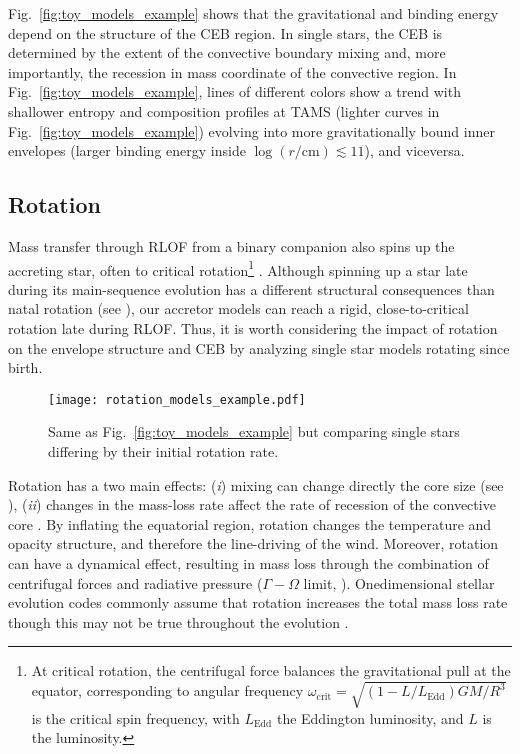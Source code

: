 \documentclass[twocolumn,twocolappendix,trackchanges]{aastex63}
\DeclareRobustCommand{\Figref}[1]{Fig.~\ref{#1}}
\begin{document}
\Figref{fig:toy_models_example} shows that the gravitational and
binding energy depend on the structure of the CEB region. In single
stars, the CEB is determined by the extent of the convective boundary
mixing and, more importantly, the recession in mass coordinate of the
convective region. In \Figref{fig:toy_models_example}, lines of
different colors show a trend with shallower entropy and composition
profiles at TAMS (lighter curves in \Figref{fig:toy_models_example})
evolving into more gravitationally bound inner envelopes (larger
binding energy inside $\log(r/\mathrm{cm})\lesssim 11$), and viceversa.

\subsection{Rotation}
\label{sec:rot_examples}

Mass transfer through RLOF from a binary companion also spins up the
accreting star, often to critical rotation\footnote{At critical
  rotation, the centrifugal force
  balances the gravitational pull at the equator, corresponding to
  angular frequency
  $\omega_\mathrm{crit}=\sqrt{(1-L/L_\mathrm{Edd})GM/R^3}$ is the
  critical spin frequency, with $L_\mathrm{Edd}$ the Eddington
  luminosity, and $L$ is the luminosity.} \citep[e.g.,][]{lubow:1975,
  packet:1981, cantiello:2007}. Although spinning up a star late during its
main-sequence evolution has a different structural consequences than
natal rotation (see \citealt{renzo:2021zoph}), our accretor models can
reach a rigid, close-to-critical rotation late during RLOF.
Thus, it is worth considering the impact of rotation on the envelope
structure and CEB by analyzing single star models rotating since
birth.

\begin{figure}[htbp]
  \centering
  \texttt{[image: rotation\_models\_example.pdf]}
  \caption{Same as \Figref{fig:toy_models_example} but comparing
    single stars differing by their initial rotation rate.}
  \label{fig:rotation_models_example}
\end{figure}

Rotation has a two main effects: (\emph{i}) mixing can change directly
the core size (see \citealt{heger:2000, maeder:00}), (\emph{ii})
changes in the mass-loss rate \cite[e.g.,][]{langer:1998, muller:2014,
  gagnier:2019} affect the rate of recession of the convective core
\citep[e.g.,][]{renzo:2017, renzo:2020ppi_conv}. By inflating the
equatorial region, rotation changes the temperature and opacity
structure, and therefore the line-driving of the wind. Moreover,
rotation can have a dynamical effect, resulting in mass loss through
the combination of centrifugal forces and radiative pressure
($\Gamma-\Omega$ limit, \citealt{langer:1998}). Onedimensional stellar
evolution codes commonly assume that rotation increases the total mass
loss rate \citep[e.g.,][]{langer:1998, heger:2000} though this may not
be true throughout the evolution \citep[e.g.,][]{gagnier:2019}.
\end{document}
